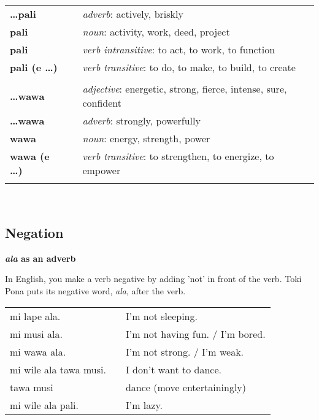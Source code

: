 \begin{supertabular}{p{2,5cm}|ll}
\textbf{\dots pali} && \textit{adverb}: actively, briskly \\ %
\textbf{pali} && \textit{noun}: activity, work, deed, project \\ %
\textbf{pali} && \textit{verb intransitive}: to act, to work, to function \\ %
\textbf{pali (e \dots)} && \textit{verb transitive}: to do, to make, to build, to create \\ %
 && \\ %
\textbf{\dots wawa} && \textit{adjective}: energetic, strong, fierce, intense, sure, confident \\ %
\textbf{\dots wawa} && \textit{adverb}: strongly, powerfully \\ %
\textbf{wawa} && \textit{noun}: energy, strength, power \\ %
\textbf{wawa (e \dots)} && \textit{verb transitive}: to strengthen, to energize, to empower \\ %
 && \\ %
\end{supertabular} \\
%
\newpage
{}
\subsection*{Negation}
%
\textbf{\textit{ala} as an adverb}

In English, you make a verb negative by adding 'not' in front of the verb.
Toki Pona puts its negative word, \textit{ala}, after the verb. 

\begin{supertabular}{p{5,5cm}|ll}
mi lape ala. && I'm not sleeping. \\ 
mi musi ala. && I'm not having fun. / I'm bored. \\
mi wawa ala. && I'm not strong. / I'm weak. \\
mi wile ala tawa musi. && I don't want to dance. \\
tawa musi && dance (move entertainingly) \\
mi wile ala pali. && I'm lazy. \\
\end{supertabular} 

